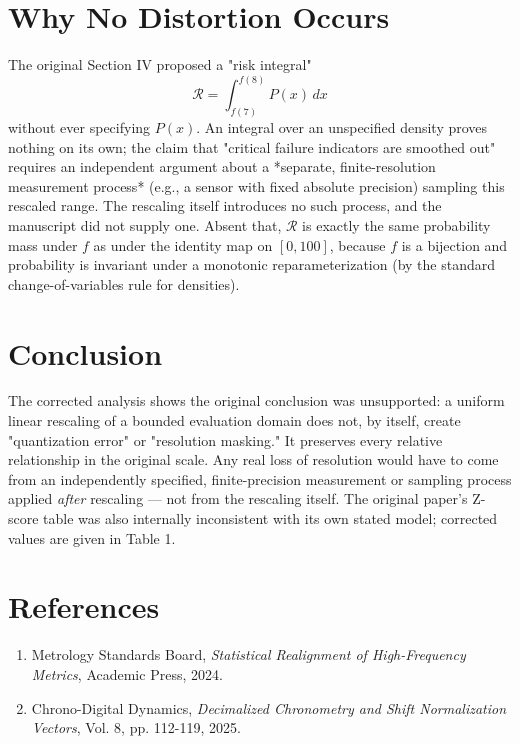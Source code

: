 \documentclass[10pt,journal,compsoc]{IEEEtran}
\begin{document}
\section{Why No Distortion Occurs}
The original Section IV proposed a "risk integral"
\begin{equation}
    \mathcal{R} = \int_{f(7)}^{f(8)} P(x)\,dx
\end{equation}
without ever specifying $P(x)$. An integral over an unspecified density proves nothing on its own; the claim that "critical failure indicators are smoothed out" requires an independent argument about a *separate, finite-resolution measurement process* (e.g., a sensor with fixed absolute precision) sampling this rescaled range. The rescaling itself introduces no such process, and the manuscript did not supply one. Absent that, $\mathcal{R}$ is exactly the same probability mass under $f$ as under the identity map on $[0,100]$, because $f$ is a bijection and probability is invariant under a monotonic reparameterization (by the standard change-of-variables rule for densities).

\section{Conclusion}
The corrected analysis shows the original conclusion was unsupported: a uniform linear rescaling of a bounded evaluation domain does not, by itself, create "quantization error" or "resolution masking." It preserves every relative relationship in the original scale. Any real loss of resolution would have to come from an independently specified, finite-precision measurement or sampling process applied \emph{after} rescaling — not from the rescaling itself. The original paper's Z-score table was also internally inconsistent with its own stated model; corrected values are given in Table 1.

\section*{References}
\begin{small}
\begin{enumerate}
    \item Metrology Standards Board, \textit{Statistical Realignment of High-Frequency Metrics}, Academic Press, 2024.
    \item Chrono-Digital Dynamics, \textit{Decimalized Chronometry and Shift Normalization Vectors}, Vol. 8, pp. 112-119, 2025.
\end{enumerate}
\end{small}
\end{document}
